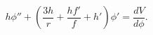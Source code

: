 \begin{equation}
h\phi''+\left(\frac{3h}{r}+\frac{h f'}{f}+h'\right)\phi'=\frac{dV}{d\phi}.
\end{equation}


